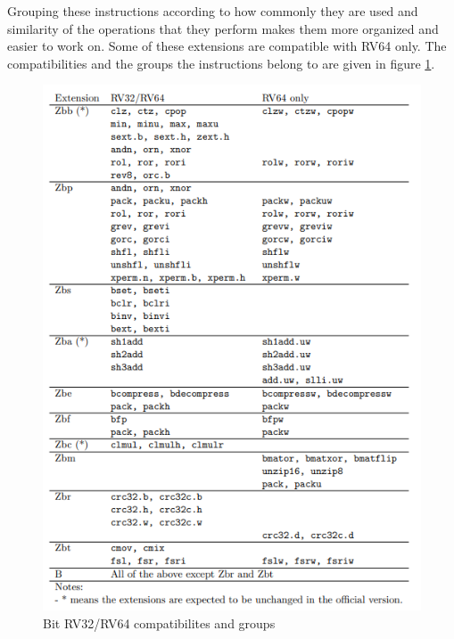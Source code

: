 Grouping these instructions according to how commonly they are used and similarity of the operations that they perform makes them more organized and easier to work on. 
Some of these extensions are compatible with RV64 only. The compatibilities and the groups the instructions belong to are given in figure \ref{fig:rv32_rv64_compatibilities_and_groups}.
\begin{figure}
    \centering
    \includegraphics{riscv/rv32_rv64_compatibilities_and_groups.png}
    \caption{Bit RV32/RV64 compatibilites and groups \cite{bitmanipdraft}}
    \label{fig:rv32_rv64_compatibilities_and_groups}
\end{figure}


